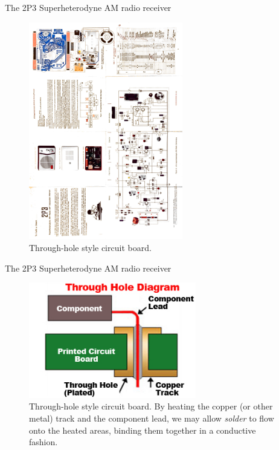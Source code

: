 \documentclass{beamer}
\begin{document}
\begin{frame}{The 2P3 Superheterodyne AM radio receiver}
\begin{figure}
\centering
\includegraphics[width=0.6\textwidth,angle=270,trim=0cm 22.5cm 9cm 0cm,clip=true]{figures/2P3.pdf}
\caption{\label{fig:2P32} Through-hole style circuit board.}
\end{figure}
\end{frame}

\begin{frame}{The 2P3 Superheterodyne AM radio receiver}
\begin{figure}
\centering
\includegraphics[width=0.65\textwidth]{figures/throughhole.png}
\caption{\label{fig:throughhole} Through-hole style circuit board.  By heating the copper (or other metal) track and the component lead, we may allow \textit{solder} to flow onto the heated areas, binding them together in a conductive fashion.}
\end{figure}
\end{frame}
\end{document}
